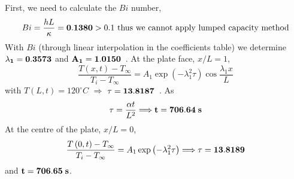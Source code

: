 \documentclass[calculator,steamtables,datasheet,solutions]{exam}
\newcommand{\frc}{\displaystyle\frac}
\begin{document}
\begin{question}
\begin{enumerate}
{First, we need to calculate the $Bi$ number,
\begin{displaymath}
  Bi = \frc{h L}{\kappa} = {\bf 0.1380} > 0.1 \text{ thus we cannot apply lumped capacity method}
\end{displaymath}
With $Bi$ (through linear interpolation in the coefficients table) we determine ${\bf \lambda_{1}=0.3573}$ and ${\bf A_{1}=1.0150}$~. At the plate face, $x/L=1$,
\begin{displaymath}
\frc{T\left(x,t\right)-T_{\infty}}{T_{i}-T_{\infty}} = A_{1}\exp{\left(-\lambda_{1}^{2}\tau\right)}\cos{\frc{\lambda_{1}x}{L}}
\end{displaymath}
with $T\left(L,t\right) = 120^{\circ}C$ $\Longrightarrow$  ${\bf\tau = 13.8187}$~. As~
\begin{displaymath}
\tau = \frc{\alpha t}{L^{2}} \Longrightarrow {\bf t=706.64\; s}
\end{displaymath}
At the centre of the plate, $x/L=0$,~
\begin{displaymath}
\frc{T\left(0,t\right)-T_{\infty}}{T_{i}-T_{\infty}} = A_{1}\exp{\left(-\lambda_{1}^{2}\tau\right)} \Longrightarrow  {\bf \tau = 13.8189}
\end{displaymath}
and ${\bf t = 706.65\; s}$.~ } 



\end{enumerate}

\end{question}

\clearpage
\end{document}
